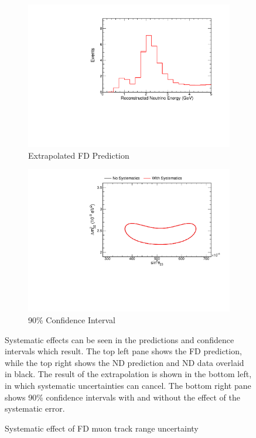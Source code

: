 {\begin{figure}
\begin{center}
\begin{subfigure}[c]{0.49\textwidth}
\includegraphics[width=\textwidth]{figures/systs/prediction/fd_extrap_prediction_trkLenFD.pdf}
\caption*{Extrapolated FD Prediction}
\end{subfigure}
\begin{subfigure}[c]{0.49\textwidth}
\includegraphics[width=\textwidth]{figures/systs/prediction/fd_extrap_contour_trkLenFD.pdf}
\caption*{90\% Confidence Interval}
\end{subfigure}
\end{center}
\caption{Systematic effect of FD muon track range uncertainty}{
Systematic effects can be seen in the predictions and confidence intervals
which result.
The top left pane shows the FD prediction, while the top right shows the
ND prediction and ND data overlaid in black.
The result of the extrapolation is shown in the bottom left, in which
systematic uncertainties can cancel.
The bottom right pane shows 90\% confidence intervals with and without
the effect of the systematic error.}
\label{syst_fig_trkLenFD}


\end{figure}}
